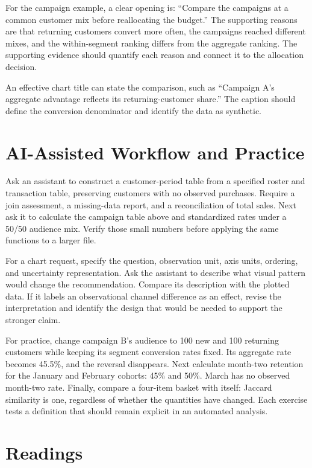 For the campaign example, a clear opening is: ``Compare the campaigns at
a common customer mix before reallocating the budget.'' The supporting
reasons are that returning customers convert more often, the campaigns
reached different mixes, and the within-segment ranking differs from the
aggregate ranking. The supporting evidence should quantify each reason
and connect it to the allocation decision.

An effective chart title can state the comparison, such as ``Campaign
A's aggregate advantage reflects its returning-customer share.'' The
caption should define the conversion denominator and identify the data
as synthetic.

\hypertarget{M02-ai-assisted-workflow-and-practice}{%
\section{AI-Assisted Workflow and
Practice}\label{M02-ai-assisted-workflow-and-practice}}

\noindent Ask an assistant to construct a customer-period table from a specified
roster and transaction table, preserving customers with no observed
purchases. Require a join assessment, a missing-data report, and a
reconciliation of total sales. Next ask it to calculate the campaign
table above and standardized rates under a 50/50 audience mix. Verify
those small numbers before applying the same functions to a larger file.

For a chart request, specify the question, observation unit, axis units,
ordering, and uncertainty representation. Ask the assistant to describe
what visual pattern would change the recommendation. Compare its
description with the plotted data. If it labels an observational channel
difference as an effect, revise the interpretation and identify the
design that would be needed to support the stronger claim.

For practice, change campaign B's audience to 100 new and 100 returning
customers while keeping its segment conversion rates fixed. Its
aggregate rate becomes 45.5\%, and the reversal disappears. Next
calculate month-two retention for the January and February cohorts: 45\%
and 50\%. March has no observed month-two rate. Finally, compare a
four-item basket with itself: Jaccard similarity is one, regardless of
whether the quantities have changed. Each exercise tests a definition
that should remain explicit in an automated analysis.

\hypertarget{M02-readings}{%
\section{Readings}\label{M02-readings}}


